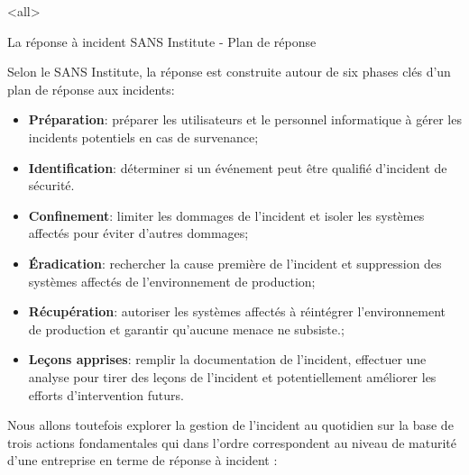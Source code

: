 

\mode<all>{\texframe
{La réponse à incident}
{SANS Institute - Plan de réponse}
{%
Selon le SANS Institute, la réponse est construite autour de six phases clés d'un plan de réponse aux incidents:

\begin{itemize}
  \item \textbf{Préparation}: préparer les utilisateurs et le personnel informatique à gérer les incidents potentiels en cas de survenance;
  \item \textbf{Identification}: déterminer si un événement peut être qualifié d'incident de sécurité.
  \item \textbf{Confinement}: limiter les dommages de l'incident et isoler les systèmes affectés pour éviter d'autres dommages;
  \item \textbf{Éradication}: rechercher la cause première de l'incident et suppression des systèmes affectés de l'environnement de production;
  \item \textbf{Récupération}: autoriser les systèmes affectés à réintégrer l'environnement de production et garantir qu'aucune menace ne subsiste.;
  \item \textbf{Leçons apprises}: remplir la documentation de l'incident, effectuer une analyse pour tirer des leçons de l'incident et potentiellement améliorer les efforts d'intervention futurs.
\end{itemize}
}} %


Nous allons toutefois explorer la  gestion de l'incident au quotidien sur la base de trois actions fondamentales qui dans l'ordre correspondent au niveau de maturité d'une entreprise en terme de réponse à incident :


